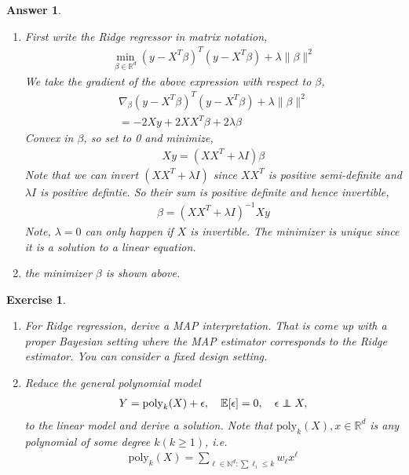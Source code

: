 \documentclass[12pt]{article}
\newcommand\independent{\protect\mathpalette{\protect\independenT}{\perp}}
\def\independenT#1#2{\mathrel{\rlap{$#1#2$}\mkern2mu{#1#2}}}
\theoremstyle{colon}
\newtheorem{exercise}{Exercise}
\newtheorem*{answer}{Answer}
\begin{document}
\begin{answer}
  \leavevmode
  \begin{enumerate}[label=\arabic*)]
    \item First write the Ridge regressor in matrix notation,
      \begin{gather*}
        \min_{\beta \in \mathbb{R}^d} (y - X^T\beta)^T (y - X^T\beta) + \lambda \lVert \beta \rVert^2
      \end{gather*}
      We take the gradient of the above expression with respect to $\beta$,
      \begin{gather*}
        \nabla_\beta (y - X^T\beta)^T (y - X^T\beta) + \lambda \lVert \beta \rVert^2 \\
        = -2Xy + 2X X^T \beta + 2 \lambda \beta
      \end{gather*}
      Convex in $\beta$, so set to 0 and minimize,
      \begin{gather*}
        Xy = (X X^T + \lambda I) \beta
      \end{gather*}
      Note that we can invert $(X X^T + \lambda I)$ since $X X^T$ is positive semi-definite and $\lambda I$ is positive defintie. So their sum is positive definite and hence invertible,
      \begin{gather*}
        \beta = (X X^T + \lambda I)^{-1}Xy
      \end{gather*}
      Note, $\lambda = 0$ can only happen if $X$ is invertible. The minimizer is unique since it is a solution to a linear equation.
    \item the minimizer $\beta$ is shown above.
  \end{enumerate}
\end{answer}

\clearpage

\begin{exercise}
  \leavevmode
  \begin{enumerate}[label=\arabic*)]
    \item For Ridge regression, derive a MAP interpretation. That is come up with a proper Bayesian setting where the MAP estimator corresponds to the Ridge estimator. You can consider a fixed design setting.
    \item Reduce the general polynomial model
      \begin{gather*}
        Y = \text{poly}_k(X) + \epsilon, \quad \mathbb{E}[\epsilon] = 0, \quad \epsilon \independent X,
      \end{gather*}
      to the linear model and derive a solution. Note that $\text{poly}_k(X), x \in \mathbb{R}^d$ is any polynomial of some degree $k (k \geq 1)$, i.e.
      \begin{gather*}
        \text{poly}_k(X) = \sum_{\ell \in \mathbb{N}^d: \sum \ell_i \leq k} w_\ell x^\ell
      \end{gather*}
  \end{enumerate}
\end{exercise}
\end{document}

